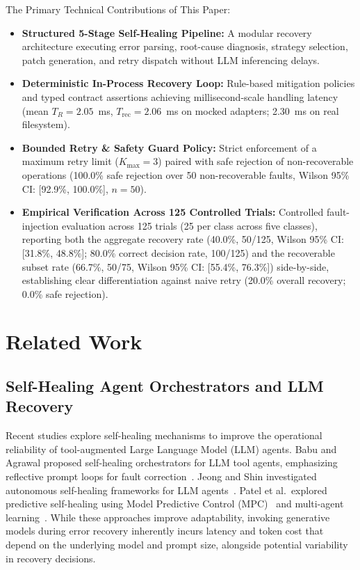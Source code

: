 \documentclass[conference]{IEEEtran}
\newcommand{\chg}[1]{{\color{blue}#1}}
\begin{document}
The Primary Technical Contributions of This Paper:
\begin{itemize}
    \item \textbf{Structured 5-Stage Self-Healing Pipeline:} A modular recovery architecture executing error parsing, root-cause diagnosis, strategy selection, patch generation, and retry dispatch without LLM inferencing delays.
    \item \chg{\textbf{Deterministic In-Process Recovery Loop:} Rule-based mitigation policies and typed contract assertions achieving millisecond-scale handling latency (mean $T_R = 2.05$~ms, $T_{\text{rec}} = 2.06$~ms on mocked adapters; 2.30~ms on real filesystem).}
    \item \chg{\textbf{Bounded Retry \& Safety Guard Policy:} Strict enforcement of a maximum retry limit ($K_{\text{max}} = 3$) paired with safe rejection of non-recoverable operations (100.0\% safe rejection over 50 non-recoverable faults, Wilson 95\% CI: [92.9\%, 100.0\%], $n=50$).}
    \item \chg{\textbf{Empirical Verification Across 125 Controlled Trials:} Controlled fault-injection evaluation across 125 trials (25 per class across five classes), reporting both the aggregate recovery rate (40.0\%, 50/125, Wilson 95\% CI: [31.8\%, 48.8\%]; 80.0\% correct decision rate, 100/125) and the recoverable subset rate (66.7\%, 50/75, Wilson 95\% CI: [55.4\%, 76.3\%]) side-by-side, establishing clear differentiation against naive retry (20.0\% overall recovery; 0.0\% safe rejection).}
\end{itemize}

\section{Related Work}

\subsection{Self-Healing Agent Orchestrators and LLM Recovery}
Recent studies explore self-healing mechanisms to improve the operational reliability of tool-augmented Large Language Model (LLM) agents. Babu and Agrawal proposed self-healing orchestrators for LLM tool agents, emphasizing reflective prompt loops for fault correction~\cite{babu2026}. Jeong and Shin investigated autonomous self-healing frameworks for LLM agents~\cite{jeong2026}. Patel et al.\ explored predictive self-healing using Model Predictive Control (MPC)~\cite{patel2026a} and multi-agent learning~\cite{patel2026b}. While these approaches improve adaptability, invoking generative models during error recovery inherently incurs latency and token cost that depend on the underlying model and prompt size, alongside potential variability in recovery decisions.
\end{document}
